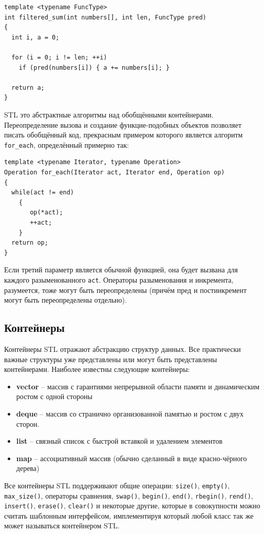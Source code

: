 \documentclass[a4paper,12pt,oneside]{article}
\begin{document}
\begin{lstlisting}
template <typename FuncType>
int filtered_sum(int numbers[], int len, FuncType pred)
{
  int i, a = 0;

  for (i = 0; i != len; ++i)
    if (pred(numbers[i]) { a += numbers[i]; }

  return a;
}
\end{lstlisting}

STL это абстрактные алгоритмы над обобщёнными контейнерами. Переопределение вызова и создание функцие-подобных объектов позволяет писать обобщённый код, прекрасным примером которого является алгоритм \lstinline!for_each!, определённый примерно так:

\begin{lstlisting}
template <typename Iterator, typename Operation>
Operation for_each(Iterator act, Iterator end, Operation op)
{
  while(act != end)
    {
       op(*act);
       ++act;
    }
  return op;
}
\end{lstlisting}

Если третий параметр является обычной функцией, она будет вызвана для каждого разыменованного \lstinline!act!. Операторы разыменования и инкремента, разумеется, тоже могут быть переопределены (причём пред и постинкремент могут быть переопределены отдельно).

\subsection{Контейнеры}

Контейнеры STL отражают абстракцию структур данных. Все практически важные структуры уже представлены или могут быть представлены контейнерами. Наиболее известны следующие контейнеры:

\begin{itemize}
\item \textbf{vector} -- массив с гарантиями непрерывной области памяти и динамическим ростом с одной стороны
\item \textbf{deque} -- массив со странично организованной памятью и ростом с двух сторон.
\item \textbf{list} -- связный список с быстрой вставкой и удалением элементов
\item \textbf{map} -- ассоциативный массив (обычно сделанный в виде красно-чёрного дерева)
\end{itemize}

Все контейнеры STL поддерживают общие операции: \lstinline!size()!, \lstinline!empty()!, \lstinline!max_size()!, операторы сравнения, \lstinline!swap()!, \lstinline!begin()!, \lstinline!end()!, \lstinline!rbegin()!, \lstinline!rend()!, \lstinline!insert()!, \lstinline!erase()!, \lstinline!clear()! и некоторые другие, которые в совокупности можно считать шаблонным интерфейсом, имплементируя который любой класс так же может называться контейнером STL.
\end{document}
